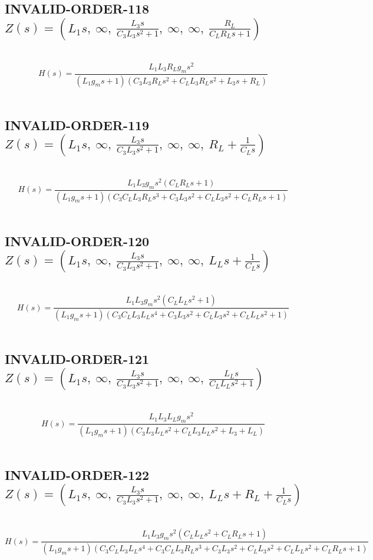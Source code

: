 \documentclass{article}
\begin{document}
\subsection{INVALID-ORDER-118 $Z(s) = \left( L_{1} s, \  \infty, \  \frac{L_{3} s}{C_{3} L_{3} s^{2} + 1}, \  \infty, \  \infty, \  \frac{R_{L}}{C_{L} R_{L} s + 1}\right)$ } \ 
\textbf{\[H(s) = \frac{L_{1} L_{3} R_{L} g_{m} s^{2}}{\left(L_{1} g_{m} s + 1\right) \left(C_{3} L_{3} R_{L} s^{2} + C_{L} L_{3} R_{L} s^{2} + L_{3} s + R_{L}\right)}\] } \ 
\subsection{INVALID-ORDER-119 $Z(s) = \left( L_{1} s, \  \infty, \  \frac{L_{3} s}{C_{3} L_{3} s^{2} + 1}, \  \infty, \  \infty, \  R_{L} + \frac{1}{C_{L} s}\right)$ } \ 
\textbf{\[H(s) = \frac{L_{1} L_{3} g_{m} s^{2} \left(C_{L} R_{L} s + 1\right)}{\left(L_{1} g_{m} s + 1\right) \left(C_{3} C_{L} L_{3} R_{L} s^{3} + C_{3} L_{3} s^{2} + C_{L} L_{3} s^{2} + C_{L} R_{L} s + 1\right)}\] } \ 
\subsection{INVALID-ORDER-120 $Z(s) = \left( L_{1} s, \  \infty, \  \frac{L_{3} s}{C_{3} L_{3} s^{2} + 1}, \  \infty, \  \infty, \  L_{L} s + \frac{1}{C_{L} s}\right)$ } \ 
\textbf{\[H(s) = \frac{L_{1} L_{3} g_{m} s^{2} \left(C_{L} L_{L} s^{2} + 1\right)}{\left(L_{1} g_{m} s + 1\right) \left(C_{3} C_{L} L_{3} L_{L} s^{4} + C_{3} L_{3} s^{2} + C_{L} L_{3} s^{2} + C_{L} L_{L} s^{2} + 1\right)}\] } \ 
\subsection{INVALID-ORDER-121 $Z(s) = \left( L_{1} s, \  \infty, \  \frac{L_{3} s}{C_{3} L_{3} s^{2} + 1}, \  \infty, \  \infty, \  \frac{L_{L} s}{C_{L} L_{L} s^{2} + 1}\right)$ } \ 
\textbf{\[H(s) = \frac{L_{1} L_{3} L_{L} g_{m} s^{2}}{\left(L_{1} g_{m} s + 1\right) \left(C_{3} L_{3} L_{L} s^{2} + C_{L} L_{3} L_{L} s^{2} + L_{3} + L_{L}\right)}\] } \ 
\subsection{INVALID-ORDER-122 $Z(s) = \left( L_{1} s, \  \infty, \  \frac{L_{3} s}{C_{3} L_{3} s^{2} + 1}, \  \infty, \  \infty, \  L_{L} s + R_{L} + \frac{1}{C_{L} s}\right)$ } \ 
\textbf{\[H(s) = \frac{L_{1} L_{3} g_{m} s^{2} \left(C_{L} L_{L} s^{2} + C_{L} R_{L} s + 1\right)}{\left(L_{1} g_{m} s + 1\right) \left(C_{3} C_{L} L_{3} L_{L} s^{4} + C_{3} C_{L} L_{3} R_{L} s^{3} + C_{3} L_{3} s^{2} + C_{L} L_{3} s^{2} + C_{L} L_{L} s^{2} + C_{L} R_{L} s + 1\right)}\] } \ 
\end{document}
